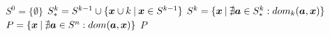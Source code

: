\begin{algorithmic}[1] %
    \State $S^0 = \big\{\emptyset\big\}$
      \State $S_*^k = S^{k-1} \cup \{\boldsymbol{x} \cup k \:|\: \boldsymbol{x} \in S^{k-1}\}$
      \State $S^k = \{\boldsymbol{x} \:|\: \nexists \boldsymbol{a} \in S_*^k: dom_k(\boldsymbol{a}, \boldsymbol{x}) \}$
    \EndFor
  \State $P = \{\boldsymbol{x} \:|\: \nexists \boldsymbol{a} \in S^n: dom(\boldsymbol{a}, \boldsymbol{x}) \}$
  \State \Return $P$
  \EndFunction
\end{algorithmic}
